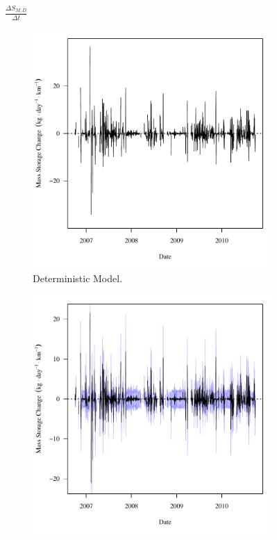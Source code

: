 \subfiguremid
\begin{landscape}
	\begin{figure}
		$ \displaystyle \frac{\Delta S_{M,D}}{\Delta t} $
		\begin{subfigure}{0.7\textwidth}
			\centering
			\includegraphics[width=\tableCustomSize]{"Figures/Results_USR/Deterministic/f Segment D"}
			\caption{Deterministic Model.}
		\end{subfigure}%
		\begin{subfigure}{0.7\textwidth}
			\centering
			\includegraphics[width=\tableCustomSize]{"Figures/Results_USR/Stochastic/f Segment D"}

\end{subfigure}
\end{figure}
\end{landscape}
